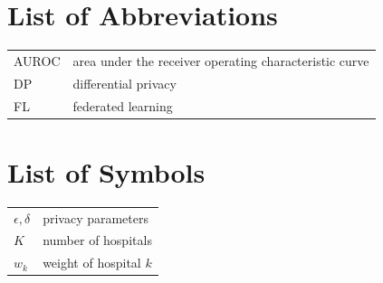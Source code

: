 \documentclass[10pt,twoside,openright]{report}
\begin{document}
\chapter*{List of Abbreviations}
\begin{tabular}{@{}ll@{}}
AUROC & area under the receiver operating characteristic curve\\
DP & differential privacy\\
FL & federated learning\\
\end{tabular}
\cleardoublepage
\chapter*{List of Symbols}
\begin{tabular}{@{}ll@{}}
$\epsilon, \delta$ & privacy parameters\\
$K$ & number of hospitals\\
$w_k$ & weight of hospital $k$\\
\end{tabular}
\cleardoublepage
\tableofcontents
\listoffigures
\listoftables
\cleardoublepage
{}






\appendix




\end{document}
